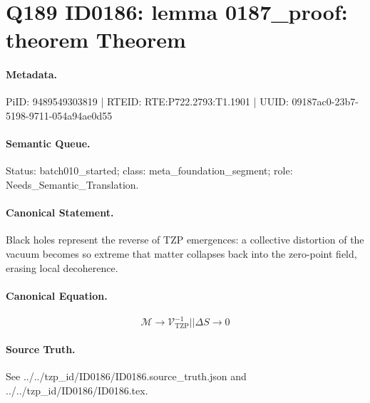 \section*{Q189 ID0186: lemma 0187\_proof: theorem Theorem}
\paragraph{Metadata.}
PiID: 9489549303819 | RTEID: RTE:P722.2793:T1.1901 | UUID: 09187ac0-23b7-5198-9711-054a94ae0d55

\paragraph{Semantic Queue.}
Status: batch010\_started; class: meta\_foundation\_segment; role: Needs\_Semantic\_Translation.

\paragraph{Canonical Statement.}
Black holes represent the reverse of TZP emergences: a collective distortion of the vacuum becomes so extreme that matter collapses back into the zero-point field, erasing local decoherence.

\paragraph{Canonical Equation.}
\[
\mathcal{M} \rightarrow \mathcal{V}_{\mathrm{TZP}}^{-1} || \Delta S \rightarrow 0
\]

\paragraph{Source Truth.}
See ../../tzp\_id/ID0186/ID0186.source\_truth.json and ../../tzp\_id/ID0186/ID0186.tex.
